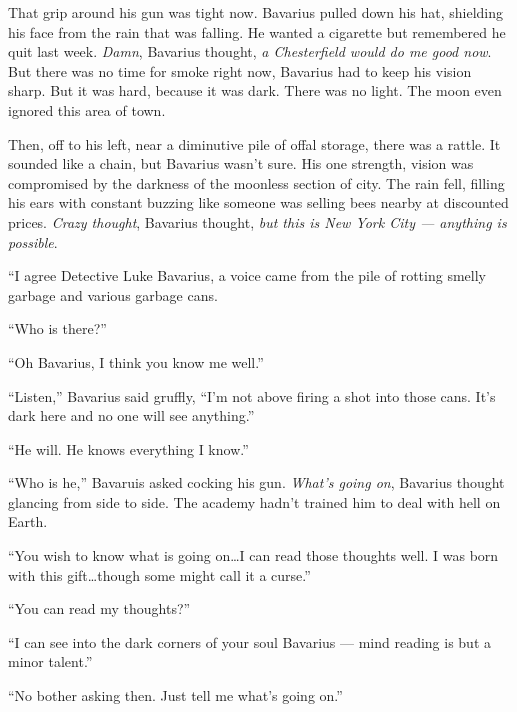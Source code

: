 That grip around his gun was tight now. Bavarius pulled down his
hat, shielding his face from the rain that was falling. He wanted a
cigarette but remembered he quit last week. {\em Damn}, Bavarius
thought, {\em a Chesterfield would do me good now}. But there was
no time for smoke right now, Bavarius had to keep his vision sharp.
But it was hard, because it was dark. There was no light. The moon
even ignored this area of town.



Then, off to his left, near a diminutive pile of offal storage,
there was a rattle. It sounded like a chain, but Bavarius wasn't
sure. His one strength, vision was compromised by the darkness of
the moonless section of city. The rain fell, filling his ears with
constant buzzing like someone was selling bees nearby at discounted
prices. {\em Crazy thought}, Bavarius thought, {\em but this is New
York City --- anything is possible}.



``I agree Detective Luke Bavarius, a voice came from the pile
of rotting smelly garbage and various garbage cans.



``Who is there?''



``Oh Bavarius, I think you know me well.''



``Listen,'' Bavarius said gruffly, ``I'm not above
firing a shot into those cans. It's dark here and no one will see
anything.''



``He will. He knows everything I know.''



``Who is he,'' Bavaruis asked cocking his gun. {\em What's
going on}, Bavarius thought glancing from side to side. The
academy hadn't trained him to deal with hell on Earth.



``You wish to know what is going on{\ldots}I can read those
thoughts well. I was born with this gift{\ldots}though some might call
it a curse.''



``You can read my thoughts?''



``I can see into the dark corners of your soul Bavarius
--- mind reading is but a minor talent.''



``No bother asking then. Just tell me what's going
on.''



